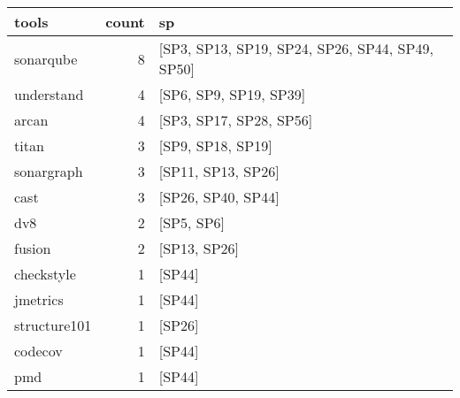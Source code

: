 \begin{tabular}{lrl}
\toprule
               tools &  count &                                                                                                           sp \\
\midrule
           sonarqube &      8 &                                                              [SP3, SP13, SP19, SP24, SP26, SP44, SP49, SP50] \\
          understand &      4 &                                                                                       [SP6, SP9, SP19, SP39] \\
               arcan &      4 &                                                                                      [SP3, SP17, SP28, SP56] \\
               titan &      3 &                                                                                            [SP9, SP18, SP19] \\
          sonargraph &      3 &                                                                                           [SP11, SP13, SP26] \\
                cast &      3 &                                                                                           [SP26, SP40, SP44] \\
                 dv8 &      2 &                                                                                                   [SP5, SP6] \\
              fusion &      2 &                                                                                                 [SP13, SP26] \\
          checkstyle &      1 &                                                                                                       [SP44] \\
            jmetrics &      1 &                                                                                                       [SP44] \\
        structure101 &      1 &                                                                                                       [SP26] \\
             codecov &      1 &                                                                                                       [SP44] \\
                 pmd &      1 &                                                                                                       [SP44] \\

\end{tabular}

